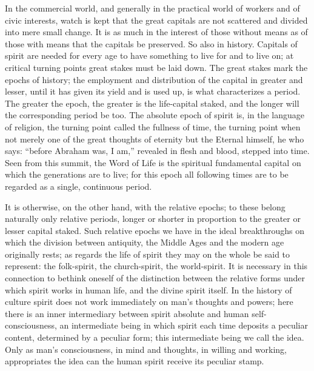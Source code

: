 \documentclass[12pt]{book}
\newcommand{\opage}[1]{\marginnote{\footnotesize\textit{[#1]}}}
\begin{document}
In the commercial world, and generally in the practical world of
workers and of civic interests, watch is kept that the great capitals
are not scattered and divided into mere small change. It is as much in
the interest of those without means as of those with means that the
capitals be preserved. So also in history. Capitals of spirit are
needed for every age to have something to live for and to live on; at
critical turning points great stakes must be laid down. The great stakes
mark the epochs of history; the employment and distribution of the
capital in greater and lesser, until it has given its yield and is used
up, is what characterizes a period. The greater the epoch, the greater
is the life-capital staked, and the longer will the corresponding period
be too. The absolute epoch of spirit is, in the language of religion,
the turning point called the fullness of time, the turning point when
not merely one of the great thoughts of eternity but the Eternal
himself, he who says: ``before Abraham was, I am,'' revealed in flesh
and blood, stepped into time. Seen from this summit, the Word of Life is
the spiritual fundamental capital on which the generations
\opage{20}\setcounter{footnote}{0}%
are to live; for this epoch all following times are to be regarded as a
single, continuous period.

It is otherwise, on the other hand, with the relative epochs; to these
belong naturally only relative periods, longer or shorter in proportion
to the greater or lesser capital staked. Such relative epochs we have in
the ideal breakthroughs on which the division between antiquity, the
Middle Ages and the modern age originally rests; as regards the life of
spirit they may on the whole be said to represent: the folk-spirit, the
church-spirit, the world-spirit. It is necessary in this connection to
bethink oneself of the distinction between the relative forms under
which spirit works in human life, and the divine spirit itself. In the
history of culture spirit does not work immediately on man's thoughts
and powers; here there is an inner intermediary between spirit absolute
and human self-consciousness, an intermediate being in which spirit
each time deposits a peculiar content, determined by a peculiar form;
this intermediate being we call the idea. Only as man's consciousness,
in mind and thoughts, in willing and working, appropriates the idea can
the human spirit receive its peculiar stamp.
\end{document}
